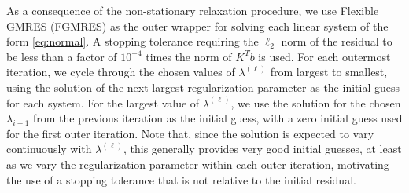 As a consequence of the non-stationary relaxation procedure, we use
Flexible GMRES (FGMRES) \cite{YSaad_2003a} as the outer wrapper for
solving each linear system of the form \eqref{eq:normal}.  A stopping
tolerance requiring the $\ell_2$ norm of the residual to be less than
a factor of $10^{-4}$ times the norm of $K^Tb$ is used.  For each
outermost iteration, we cycle through the chosen values of
$\lambda^{(\ell)}$ from largest to smallest, using the solution of the
next-largest regularization parameter as the initial guess for each
system.  For the largest value of $\lambda^{(\ell)}$, we use the
solution for the chosen $\lambda_{i-1}$ from the previous iteration as
the initial guess, with a zero initial guess used for the first outer
iteration.  Note that, since the solution is expected to vary
continuously with $\lambda^{(\ell)}$, this generally provides very
good initial guesses, at least as we vary the regularization parameter
within each outer iteration, motivating the use of a stopping
tolerance that is not relative to the initial residual.

